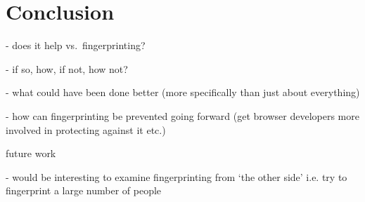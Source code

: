\chapter{Conclusion}

- does it help vs.\ fingerprinting?

- if so, how, if not, how not?

- what could have been done better (more specifically than just about everything)

- how can fingerprinting be prevented going forward (get browser developers more involved in protecting against it etc.)

future work

- would be interesting to examine fingerprinting from `the other side' i.e. try to fingerprint a large number of people

